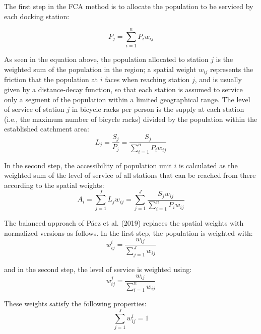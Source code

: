 \documentclass[]{elsarticle} %
\begin{document}
The first step in the FCA method is to allocate the population to be
serviced by each docking station:

\begin{equation}
\label{eq:population-allocation}
P_j = {\sum_{i = 1}^{n} P_i{w_{ij}}}
\end{equation}

As seen in the equation above, the population allocated to station \(j\)
is the weighted sum of the population in the region; a spatial weight
\(w_{ij}\) represents the friction that the population at \(i\) faces
when reaching station \(j\), and is usually given by a distance-decay
function, so that each station is assumed to service only a segment of
the population within a limited geographical range. The level of service
of station \(j\) in bicycle racks per person is the supply at each
station (i.e., the maximum number of bicycle racks) divided by the
population within the established catchment area: \begin{equation}
\label{eq:level-of-service}
L_j = \frac {S_j}{P_j} = \frac {S_j}{{\sum_{i = 1}^{n} P_i{w_{ij}}}}
\end{equation}

In the second step, the accessibility of population unit \(i\) is
calculated as the weighted sum of the level of service of all stations
that can be reached from there according to the spatial weights:
\begin{equation}
\label{eq:FCA-accessibility}
A_i = {\sum_{j = 1}^{J} L_j{w_{ij}}} = {\sum_{j = 1}^{J} \frac {S_j{w_{ij}}}{\sum_{i = 1}^{n} P_i{w_{ij}}}}
\end{equation}

The balanced approach of Páez et al. (2019) replaces the spatial weights
with normalized versions as follows. In the first step, the population
is weighted with: \begin{equation}
\label{eq:spatial-weights}
{w_{ij}^{i} = \frac {w_{ij}}{\sum_{j = 1}^{J} {w_{ij}}}}
\end{equation}

\noindent and in the second step, the level of service is weighted
using: \begin{equation}
\label{eq:spatial-weights-2}
{w_{ij}^{j} = \frac {w_{ij}}{\sum_{i = 1}^{n} {w_{ij}}}}
\end{equation}

These weights satisfy the following properties: \begin{equation}
\label{eq:weights}
\sum_{j = 1}^{J} {w^i_{ij}} = 1
\end{equation}
\end{document}
